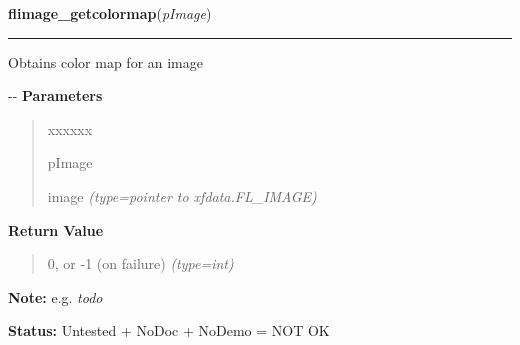 \hspace{.8\funcindent}\begin{boxedminipage}{\funcwidth}

    \raggedright \textbf{flimage\_getcolormap}(\textit{pImage})

    \vspace{-1.5ex}

    \rule{\textwidth}{0.5\fboxrule}
\setlength{\parskip}{2ex}

Obtains color map for an image

-{}-
\setlength{\parskip}{1ex}
      \textbf{Parameters}
      \vspace{-1ex}

      \begin{quote}
        \begin{Ventry}{xxxxxx}

          \item[pImage]


image
            {\it (type=pointer to xfdata.FL\_IMAGE)}

        \end{Ventry}

      \end{quote}

      \textbf{Return Value}
    \vspace{-1ex}

      \begin{quote}

0, or -1 (on failure)
      {\it (type=int)}

      \end{quote}

\textbf{Note:} 
e.g. \emph{todo}


\textbf{Status:} 
Untested + NoDoc + NoDemo = NOT OK


    \end{boxedminipage}

    \label{xformslib:flflimage:fl_select_mediancut_quantizer}

    \vspace{0.5ex}

